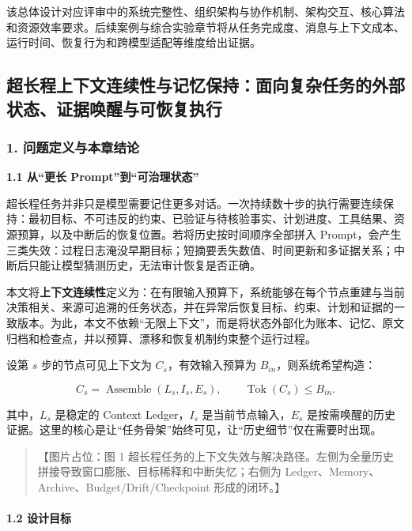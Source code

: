 \documentclass[UTF8,a4paper,12pt]{ctexart}
\begin{document}
该总体设计对应评审中的系统完整性、组织架构与协作机制、架构交互、核心算法和资源效率要求。后续案例与综合实验章节将从任务完成度、消息与上下文成本、运行时间、恢复行为和跨模型适配等维度给出证据。

\subsection{超长程上下文连续性与记忆保持：面向复杂任务的外部状态、证据唤醒与可恢复执行}

\subsubsection{1. 问题定义与本章结论}

\par\noindent\textbf{1.1 从``更长 Prompt''到``可治理状态''}\par\smallskip

超长程任务并非只是模型需要记住更多对话。一次持续数十步的执行需要连续保持：最初目标、不可违反的约束、已验证与待核验事实、计划进度、工具结果、资源预算，以及中断后的恢复位置。若将历史按时间顺序全部拼入 Prompt，会产生三类失效：过程日志淹没早期目标；短摘要丢失数值、时间更新和多证据关系；中断后只能让模型猜测历史，无法审计恢复是否正确。

本文将\textbf{上下文连续性}定义为：在有限输入预算下，系统能够在每个节点重建与当前决策相关、来源可追溯的任务状态，并在异常后恢复目标、约束、计划和证据的一致版本。为此，本文不依赖``无限上下文''，而是将状态外部化为账本、记忆、原文归档和检查点，并以预算、漂移和恢复机制约束整个运行过程。

设第 \(s\) 步的节点可见上下文为 \(C_s\)，有效输入预算为 \(B_{in}\)，则系统希望构造：

\[
C_s=\operatorname{Assemble}(L_s,I_s,E_s),\qquad \operatorname{Tok}(C_s)\le B_{in}.
\]

其中，\(L_s\) 是稳定的 Context Ledger，\(I_s\) 是当前节点输入，\(E_s\) 是按需唤醒的历史证据。这里的核心是让``任务骨架''始终可见，让``历史细节''仅在需要时出现。

\begin{quote}
【图片占位：图 1 超长程任务的上下文失效与解决路径。左侧为全量历史拼接导致窗口膨胀、目标稀释和中断失忆；右侧为 Ledger、Memory、Archive、Budget/Drift/Checkpoint 形成的闭环。】
\end{quote}

\paragraph{1.2 设计目标}
\end{document}
